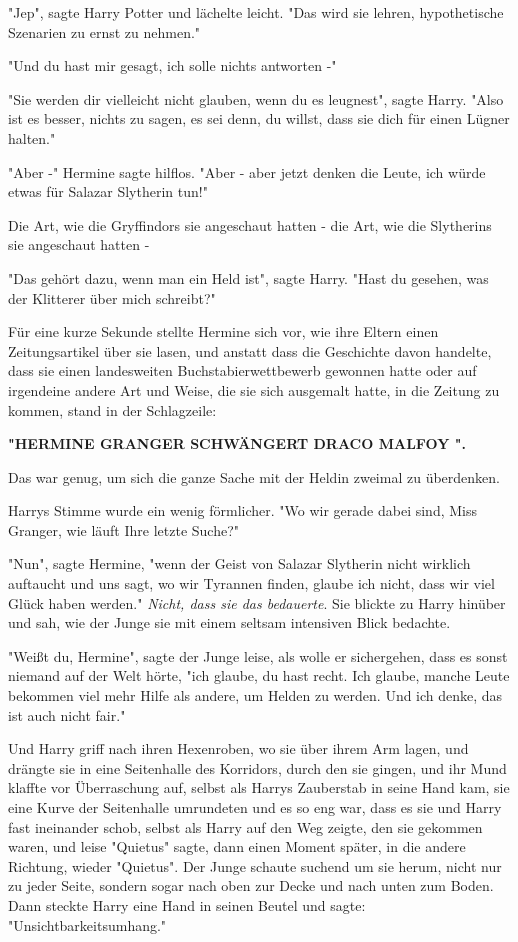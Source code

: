 {"Jep", sagte Harry Potter und lächelte leicht. "Das wird sie lehren, hypothetische Szenarien zu ernst zu nehmen."

"Und du hast mir gesagt, ich solle nichts antworten -"

"Sie werden dir vielleicht nicht glauben, wenn du es leugnest", sagte Harry. "Also ist es besser, nichts zu sagen, es sei denn, du willst, dass sie dich für einen Lügner halten."

"Aber -" Hermine sagte hilflos. "Aber - aber jetzt denken die Leute, ich würde etwas für Salazar Slytherin tun!"

Die Art, wie die Gryffindors sie angeschaut hatten - die Art, wie die Slytherins sie angeschaut hatten -

"Das gehört dazu, wenn man ein Held ist", sagte Harry. "Hast du gesehen, was der Klitterer über mich schreibt?"

Für eine kurze Sekunde stellte Hermine sich vor, wie ihre Eltern einen Zeitungsartikel über sie lasen, und anstatt dass die Geschichte davon handelte, dass sie einen landesweiten Buchstabierwettbewerb gewonnen hatte oder auf irgendeine andere Art und Weise, die sie sich ausgemalt hatte, in die Zeitung zu kommen, stand in der Schlagzeile:

\textbf{"HERMINE GRANGER SCHWÄNGERT DRACO MALFOY ".}

Das war genug, um sich die ganze Sache mit der Heldin zweimal zu überdenken.

Harrys Stimme wurde ein wenig förmlicher. "Wo wir gerade dabei sind, Miss Granger, wie läuft Ihre letzte Suche?"

"Nun", sagte Hermine, "wenn der Geist von Salazar Slytherin nicht wirklich auftaucht und uns sagt, wo wir Tyrannen finden, glaube ich nicht, dass wir viel Glück haben werden." \emph{Nicht, dass sie das bedauerte}. Sie blickte zu Harry hinüber und sah, wie der Junge sie mit einem seltsam intensiven Blick bedachte.

"Weißt du, Hermine", sagte der Junge leise, als wolle er sichergehen, dass es sonst niemand auf der Welt hörte, "ich glaube, du hast recht. Ich glaube, manche Leute bekommen viel mehr Hilfe als andere, um Helden zu werden. Und ich denke, das ist auch nicht fair."

Und Harry griff nach ihren Hexenroben, wo sie über ihrem Arm lagen, und drängte sie in eine Seitenhalle des Korridors, durch den sie gingen, und ihr Mund klaffte vor Überraschung auf, selbst als Harrys Zauberstab in seine Hand kam, sie eine Kurve der Seitenhalle umrundeten und es so eng war, dass es sie und Harry fast ineinander schob, selbst als Harry auf den Weg zeigte, den sie gekommen waren, und leise "Quietus" sagte, dann einen Moment später, in die andere Richtung, wieder "Quietus". Der Junge schaute suchend um sie herum, nicht nur zu jeder Seite, sondern sogar nach oben zur Decke und nach unten zum Boden. Dann steckte Harry eine Hand in seinen Beutel und sagte: "Unsichtbarkeitsumhang."

}
